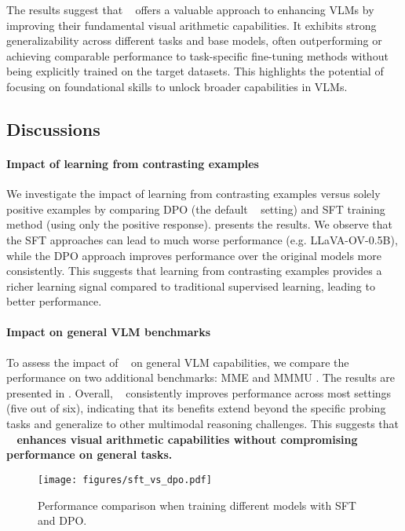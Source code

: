 The results suggest that \method~ offers a valuable approach to enhancing VLMs by improving their fundamental visual arithmetic capabilities. It exhibits strong generalizability across different tasks and base models, often outperforming or achieving comparable performance to task-specific fine-tuning methods without being explicitly trained on the target datasets. This highlights the potential of focusing on foundational skills to unlock broader capabilities in VLMs.


\subsection{Discussions}

\paragraph{Impact of learning from contrasting examples}
We investigate the impact of learning from contrasting examples versus solely positive examples by comparing DPO (the default \method~ setting) and SFT training method (using only the positive response).  presents the results. We observe that the SFT approaches can lead to much worse performance (e.g. LLaVA-OV-0.5B), while the DPO approach improves performance over the original models more consistently. This suggests that learning from contrasting examples provides a richer learning signal compared to traditional supervised learning, leading to better performance. 


\paragraph{Impact on general VLM benchmarks}

To assess the impact of \method~ on general VLM capabilities, we compare the performance on two additional benchmarks: MME \cite{fu2023mme} and MMMU \cite{yue2024cvpr}. The results are presented in . Overall, \method~ consistently improves performance across most settings (five out of six), indicating that its benefits extend beyond the specific probing tasks and generalize to other multimodal reasoning challenges. This suggests that \textbf{\method~ enhances visual arithmetic capabilities without compromising performance on general tasks.}

\begin{figure}[t]
    \centering
    \texttt{[image: figures/sft\_vs\_dpo.pdf]}
    \vspace{-4mm}
    \caption{Performance comparison when training different models with SFT and DPO.}
    \vspace{-5mm}
    \label{fig:sft_vs_dpo}
\end{figure}

